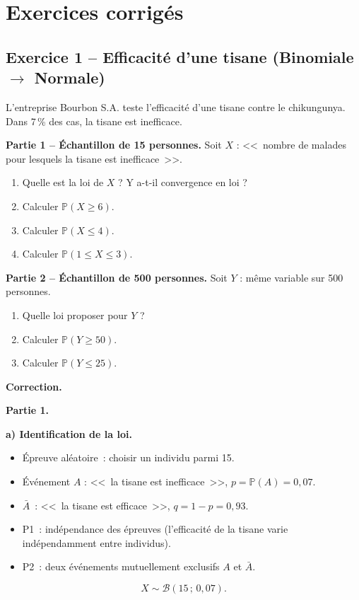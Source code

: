 \documentclass[11pt,a4paper]{article}
\renewcommand{\P}{\mathbb{P}}
\begin{document}
\newpage
\section{Exercices corrig\'es}

\subsection{Exercice 1 -- Efficacit\'e d'une tisane (Binomiale $\to$ Normale)}

\begin{exbox}[\'Enonc\'e]
L'entreprise Bourbon S.A. teste l'efficacit\'e d'une tisane contre le chikungunya. Dans 7\,\% des cas, la tisane est inefficace.

\textbf{Partie 1 -- \'Echantillon de 15 personnes.} Soit $X$ : <<~{}nombre de malades pour lesquels la tisane est inefficace~>>.
\begin{enumerate}[label=\alph*)]
  \item Quelle est la loi de $X$ ? Y a-t-il convergence en loi ?
  \item Calculer $\P(X \geq 6)$.
  \item Calculer $\P(X \leq 4)$.
  \item Calculer $\P(1 \leq X \leq 3)$.
\end{enumerate}

\textbf{Partie 2 -- \'Echantillon de 500 personnes.} Soit $Y$ : m\^eme variable sur 500 personnes.
\begin{enumerate}[label=\alph*)]
  \item Quelle loi proposer pour $Y$ ?
  \item Calculer $\P(Y \geq 50)$.
  \item Calculer $\P(Y \leq 25)$.
\end{enumerate}
\end{exbox}

\textbf{Correction.}

\textbf{Partie 1.}

\textbf{a) Identification de la loi.}

\begin{itemize}
  \item \'Epreuve al\'eatoire~: choisir un individu parmi 15.
  \item \'Ev\'enement $A$ : <<~{}la tisane est inefficace~>>, $p = \P(A) = 0{,}07$.
  \item $\bar{A}$~: <<~{}la tisane est efficace~>>, $q = 1-p = 0{,}93$.
  \item P1~: ind\'ependance des \'epreuves (l'efficacit\'e de la tisane varie ind\'ependamment entre individus). \checkmark
  \item P2~: deux \'ev\'enements mutuellement exclusifs $A$ et $\bar{A}$. \checkmark
\end{itemize}
$$X \sim \mathcal{B}(15\,;\,0{,}07).$$
\end{document}
